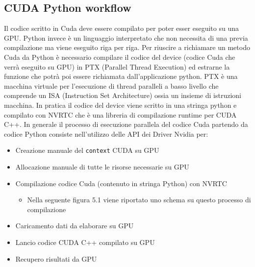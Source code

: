 \documentclass[12pt,a4paper]{report}
\begin{document}
\subsection{CUDA Python workflow}
Il codice scritto in Cuda deve essere compilato per poter esser eseguito su una GPU. Python invece è un linguaggio interpretato che non necessita di una previa compilazione ma viene eseguito riga per riga. Per riuscire a richiamare un metodo Cuda da Python è necessario compilare il codice del device (codice Cuda che verrà eseguito su GPU) in PTX (Parallel Thread Execution) ed estrarne la funzione che potrà poi essere richiamata dall'applicazione python. PTX è una macchina virtuale per l'esecuzione di thread paralleli a basso livello che comprende un ISA (Instruction Set Architecture) ossia un insieme di istruzioni macchina. \newline
In pratica il codice del device viene scritto in una stringa python e compilato con NVRTC che è una libreria di compilazione runtime per CUDA C++. \newline
In generale il processo di esecuzione parallela del codice Cuda partendo da codice Python consiste nell'utilizzo delle API dei Driver Nvidia per:
\begin{itemize}
    \item Creazione manuale del \verb|context| CUDA su GPU
    \item Allocazione manuale di tutte le risorse necessarie su GPU
    \item Compilazione codice Cuda (contenuto in stringa Python) con NVRTC
    \begin{itemize}
        \item Nella seguente figura 5.1 viene riportato uno schema su questo processo di compilazione
    \end{itemize}
        \begin{figure}[H]
        \centering
        \begin{floatrow}[1]
        \end{floatrow}
        \end{figure} 
    \item Caricamento dati da elaborare su GPU
    \item Lancio codice CUDA C++ compilato su GPU
    \item Recupero risultati da GPU 
\end{itemize} \newpage
\end{document}
